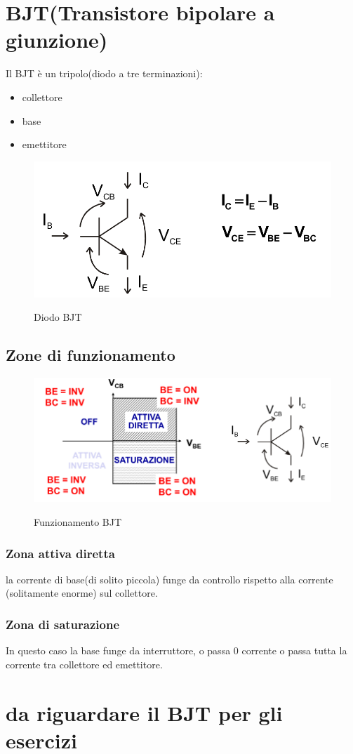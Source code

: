 \section{BJT(Transistore bipolare a giunzione)}

Il BJT è un tripolo(diodo a tre terminazioni):
\begin{itemize}
    \item collettore
    \item base 
    \item emettitore
\end{itemize}

\begin{figure}[H]
    \centering
    \includegraphics[width=0.5\linewidth]{2 - dispositivi elettronici/imgs/Screenshot from 2022-06-14 23-14-03.png}
    \label{fig:BJT}
    \caption{Diodo BJT}
\end{figure}

\subsection{Zone di funzionamento}

\begin{figure}[H]
    \centering
    \includegraphics[width=0.5\linewidth]{2 - dispositivi elettronici/imgs/Screenshot from 2022-06-14 23-16-33.png}
    \label{fig:BJT_funzionamento}
    \caption{Funzionamento BJT}
\end{figure}

\subsubsection{Zona attiva diretta}
la corrente di base(di solito piccola) funge da controllo rispetto alla corrente (solitamente enorme) sul collettore.

\subsubsection{Zona di saturazione}
In questo caso la base funge da interruttore, o passa 0 corrente o passa tutta la corrente tra collettore ed emettitore.

\section{da riguardare il BJT per gli esercizi}